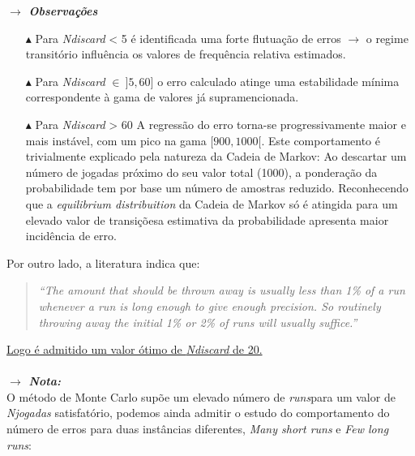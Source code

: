 \noindent\textbf{\textit{$\rightarrow$ Observações}}

\begin{itemize}
    \item[$\blacktriangle$] Para \textit{Ndiscard} < 5 é identificada uma forte flutuação de erros $\rightarrow$ o regime transitório influência os valores de frequência relativa estimados.
    \item[$\blacktriangle$] Para \textit{Ndiscard} $\in\ ]5, 60]$ o erro calculado atinge uma estabilidade mínima correspondente à gama de valores já supramencionada.
    \item[$\blacktriangle$] Para \textit{Ndiscard} > 60 A regressão do erro torna-se progressivamente maior e mais instável, com um pico na gama $[900,1000[$. Este comportamento é trivialmente explicado pela natureza da Cadeia de Markov: Ao descartar um número de jogadas próximo do seu valor total (1000), a ponderação da probabilidade tem por base um número de amostras reduzido. Reconhecendo que a \textit{equilibrium distribuition} da Cadeia de Markov só é atingida para um elevado valor de transições\footnotemark[5] a estimativa da probabilidade apresenta maior incidência de erro.
\end{itemize}

Por outro lado, a literatura indica que:

\begin{quote}
   \textit{``The amount that should be thrown away is usually less than 1\% of a run whenever a run is long enough to give enough precision. So routinely throwing away the initial 1\% or 2\% of runs will usually suffice.''}\cite{Geyer1992}
\end{quote}

\underline{Logo é admitido um valor ótimo de \textit{Ndiscard} de 20.}
\\\\
\textbf{\textit{$\rightarrow$ Nota:}}
\\
O método de Monte Carlo supõe um elevado número de \textit{runs}\footnotemark[6] para um valor de \textit{Njogadas} satisfatório, podemos ainda admitir o estudo do comportamento do número de erros para duas instâncias diferentes, \textit{Many short runs} e \textit{Few long runs}:

